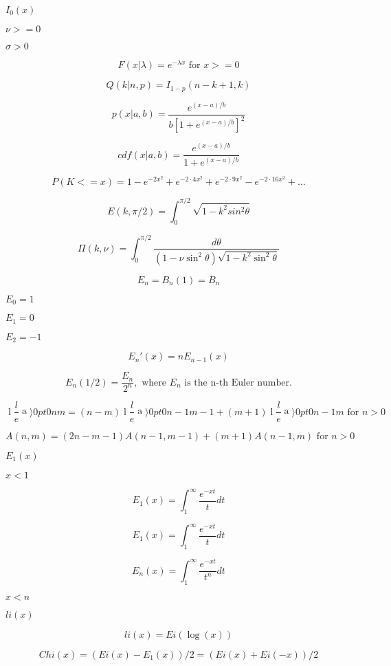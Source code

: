 \documentclass{article}
\begin{document}
$I_0(x)$
\pagebreak

$\nu >= 0$
\pagebreak

$\sigma > 0$
\pagebreak

\[ F(x|\lambda) = e^{-\lambda x} \mbox{ for } x >= 0 \]
\pagebreak

\[ Q(k|n,p) = I_{1-p}(n-k+1, k) \]
\pagebreak

\[ p(x| a, b) = \frac{e^{(x - a)/b}}{b[1 + e^{(x - a)/b}]^2} \]
\pagebreak

\[ cdf(x| a, b) = \frac{e^{(x - a)/b}}{1 + e^{(x - a)/b}} \]
\pagebreak

\[ P(K <= x) = 1 - e^{-2x^2} + e^{-2 \cdot 4 x^2} + e^{-2 \cdot 9 x^2} - e^{-2 \cdot 16 x^2} + ... \]
\pagebreak

\[ E(k,\pi/2) = \int_0^{\pi/2}\sqrt{1 - k^2 sin^2\theta} \]
\pagebreak

\[ \Pi(k,\nu) = \int_0^{\pi/2} \frac{d\theta} {(1 - \nu \sin^2\theta)\sqrt{1 - k^2 \sin^2\theta}} \]
\pagebreak

\[ E_n = B_n(1) = B_n \]
\pagebreak

$ E_0 = 1 $
\pagebreak

$ E_1 = 0 $
\pagebreak

$ E_2 = -1 $
\pagebreak

\[ E_n'(x) = n E_{n-1}(x) \]
\pagebreak

\[ E_n(1/2) = \frac{E_n}{2^n}, \mbox{ where } E_n \mbox{ is the n-th Euler number.} \]
\pagebreak

\[ \genfrac\langle\rangle{0pt}{0}{n}{m} = (n-m)\genfrac\langle\rangle{0pt}{0}{n-1}{m-1} + (m+1)\genfrac\langle\rangle{0pt}{0}{n-1}{m} \mbox{ for } n > 0 \]
\pagebreak

\[ A(n,m) = (2n-m-1)A(n-1,m-1) + (m+1)A(n-1,m) \mbox{ for } n > 0 \]
\pagebreak

$ E_1(x) $
\pagebreak

$ x < 1 $
\pagebreak

\[ E_1(x) = \int_{1}^{\infty} \frac{e^{-xt}}{t} dt \]
\pagebreak

\[ E_1(x) = \int_{1}^\infty \frac{e^{-xt}}{t} dt \]
\pagebreak

\[ E_n(x) = \int_{1}^\infty \frac{e^{-xt}}{t^n} dt \]
\pagebreak

$ x < n $
\pagebreak

$ li(x) $
\pagebreak

\[ li(x) = Ei(\log(x)) \]
\pagebreak

\[ Chi(x) = (Ei(x) - E_1(x))/ 2 = (Ei(x) + Ei(-x))/2 \]
\pagebreak
\end{document}
